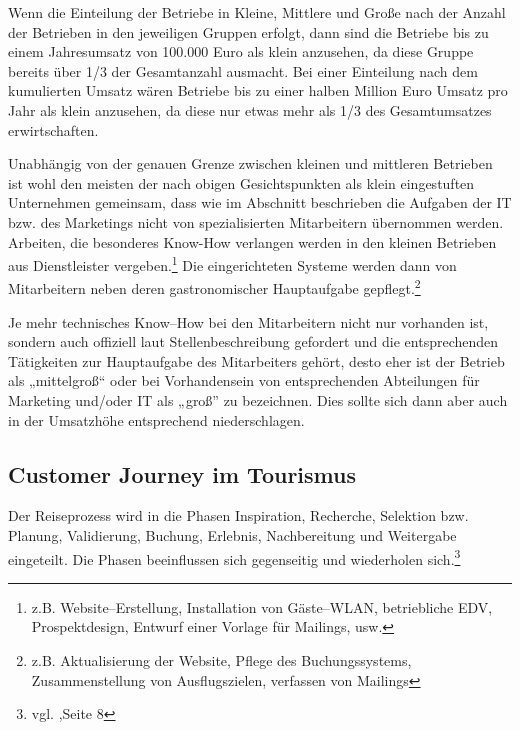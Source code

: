 Wenn die Einteilung der Betriebe in Kleine, Mittlere und Große nach der Anzahl der Betrieben in den jeweiligen Gruppen erfolgt, dann sind die Betriebe bis zu einem Jahresumsatz von 100.000 Euro als klein anzusehen, da diese Gruppe bereits über 1/3 der Gesamtanzahl ausmacht. Bei einer Einteilung nach dem kumulierten Umsatz wären Betriebe bis zu einer halben Million Euro Umsatz pro Jahr als klein anzusehen, da diese nur etwas mehr als 1/3 des Gesamtumsatzes erwirtschaften.

Unabhängig von der genauen Grenze zwischen kleinen und mittleren Betrieben ist wohl den meisten der nach obigen Gesichtspunkten als klein eingestuften Unternehmen gemeinsam, dass wie im Abschnitt  beschrieben die Aufgaben der IT bzw. des Marketings nicht von spezialisierten Mitarbeitern übernommen werden. Arbeiten, die besonderes Know-How verlangen werden in den kleinen Betrieben aus Dienstleister vergeben.\footnote{z.B. Website–Erstellung, Installation von Gäste–WLAN, betriebliche EDV, Prospektdesign, Entwurf einer Vorlage für Mailings, usw.} Die eingerichteten Systeme werden dann von Mitarbeitern neben deren gastronomischer Hauptaufgabe gepflegt.\footnote{z.B. Aktualisierung der Website, Pflege des Buchungssystems, Zusammenstellung von Ausflugszielen, verfassen von Mailings}

Je mehr technisches Know–How bei den Mitarbeitern nicht nur vorhanden ist, sondern auch offiziell laut Stellenbeschreibung gefordert und die entsprechenden Tätigkeiten zur Hauptaufgabe des Mitarbeiters gehört, desto eher ist der Betrieb als „mittelgroß“ oder bei Vorhandensein von entsprechenden Abteilungen für Marketing und/oder IT als „groß” zu bezeichnen. Dies sollte sich dann aber auch in der  Umsatzhöhe entsprechend niederschlagen.

\subsection{Customer Journey im Tourismus} %
\label{sub:customer_journey_im_tourismus}
Der Reiseprozess wird in die Phasen Inspiration, Recherche, Selektion bzw. Planung, Validierung, Buchung, Erlebnis, Nachbereitung und Weitergabe eingeteilt. Die Phasen beeinflussen sich gegenseitig und wiederholen sich.\footnote{vgl. \cite{cole:7step},Seite 8} 

